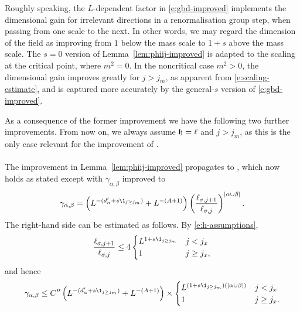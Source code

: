 Roughly speaking, the $L$-dependent factor in \eqref{e:gbd-improved} implements the dimensional gain
for irrelevant directions in a renormalisation group step, when passing from one scale to the next.
In other words, we may regard the dimension of the field as improving from $1$ below the
mass scale to $1+s$ above the mass scale.
The $s=0$ version of Lemma~\ref{lem:phiij-improved} is adapted to the scaling at the critical point, where $m^2=0$.
In the noncritical case $m^2>0$, the dimensional gain improves greatly for $j>j_m$,
as apparent from \eqref{e:scaling-estimate}, and is
captured more accurately by the general-$s$ version of \eqref{e:gbd-improved}.

As a consequence of the former improvement we have the following two further improvements.
From now on, we always assume $\mathfrak{h}=\ell$ and $j>j_m$, as this is the only case relevant for
the improvement of \cite[Proposition~\ref{IE-prop:cl}]{BS-rg-IE}.

\paragraph{\cite[Proposition~\ref{loc-prop:1-LTdefXY}]{BS-rg-loc}}
The improvement in Lemma~\ref{lem:phiij-improved} propagates to
\cite[Proposition~\ref{loc-prop:1-LTdefXY}]{BS-rg-loc}, which now holds
as stated except with
$\gamma_{\alpha,\beta}$
improved to
\begin{equation}
\label{e:cgamobs}
    \gamma_{\alpha,\beta}
        =
    \left(
    L^{-(d_\alpha' + s \1_{j \geq j_m})} +  L^{-(A+1)}
    \right)
    \left( \frac{\ell_{\sigma,j+1}}{\ell_{\sigma,j}} \right)^{|\alpha \cup \beta|}
    .
\end{equation}
The right-hand side can be estimated as follows.
By \eqref{e:h-assumptions},
\begin{equation}
\frac{\ell_{\sigma,j+1}}{\ell_{\sigma,j}} \leq
4
  \begin{cases}
  L^{1 + s \1_{{j \geq j_m}}} & j < j_x \\
  1 & j \geq j_x,
  \end{cases}
\end{equation}
and hence
\begin{equation}
\label{e:cgamobs-L}
    \gamma_{\alpha,\beta}
    \le C''
    \left(
    L^{-(d_\alpha' + s \1_{j \geq j_m})} +  L^{-(A+1)}
    \right)
    \times
    \begin{cases}
    L^{(1 + s \1_{{j \geq j_m}})(|\alpha \cup \beta|)} & j < j_x \\
    1 & j \geq j_x.
    \end{cases}
\end{equation}

